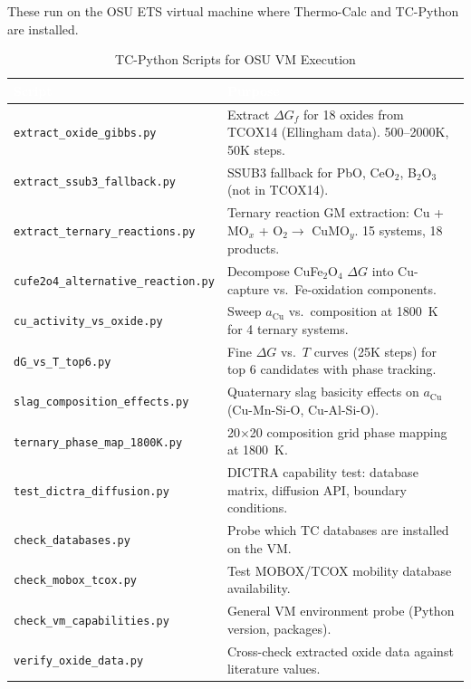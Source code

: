 \documentclass[11pt]{article}
\begin{document}
These run on the OSU ETS virtual machine where Thermo-Calc and TC-Python are installed.

\begin{table}[H]
\caption{TC-Python Scripts for OSU VM Execution}
\label{tab:vm_scripts}
\centering
\renewcommand{\arraystretch}{1.15}
\footnotesize
\begin{tabular}{|p{2.6in}|p{3.4in}|}
\hline
\rowcolor{headercolor}
\textcolor{white}{\textbf{Script}} & \textcolor{white}{\textbf{Purpose}} \\
\hline
\texttt{extract\_oxide\_gibbs.py} & Extract $\Delta G_f$ for 18 oxides from TCOX14 (Ellingham data). 500--2000K, 50K steps. \\
\hline
\rowcolor{altrow}
\texttt{extract\_ssub3\_fallback.py} & SSUB3 fallback for PbO, CeO$_2$, B$_2$O$_3$ (not in TCOX14). \\
\hline
\texttt{extract\_ternary\_reactions.py} & Ternary reaction GM extraction: Cu + MO$_x$ + O$_2 \to$ CuMO$_y$. 15 systems, 18 products. \\
\hline
\rowcolor{altrow}
\texttt{cufe2o4\_alternative\_reaction.py} & Decompose CuFe$_2$O$_4$ $\Delta G$ into Cu-capture vs.\ Fe-oxidation components. \\
\hline
\texttt{cu\_activity\_vs\_oxide.py} & Sweep $a_{\text{Cu}}$ vs.\ composition at \SI{1800}{\kelvin} for 4 ternary systems. \\
\hline
\rowcolor{altrow}
\texttt{dG\_vs\_T\_top6.py} & Fine $\Delta G$ vs.\ $T$ curves (25K steps) for top 6 candidates with phase tracking. \\
\hline
\texttt{slag\_composition\_effects.py} & Quaternary slag basicity effects on $a_{\text{Cu}}$ (Cu-Mn-Si-O, Cu-Al-Si-O). \\
\hline
\rowcolor{altrow}
\texttt{ternary\_phase\_map\_1800K.py} & 20$\times$20 composition grid phase mapping at \SI{1800}{\kelvin}. \\
\hline
\texttt{test\_dictra\_diffusion.py} & DICTRA capability test: database matrix, diffusion API, boundary conditions. \\
\hline
\rowcolor{altrow}
\texttt{check\_databases.py} & Probe which TC databases are installed on the VM. \\
\hline
\texttt{check\_mobox\_tcox.py} & Test MOBOX/TCOX mobility database availability. \\
\hline
\rowcolor{altrow}
\texttt{check\_vm\_capabilities.py} & General VM environment probe (Python version, packages). \\
\hline
\texttt{verify\_oxide\_data.py} & Cross-check extracted oxide data against literature values. \\

\end{tabular}
\end{table}
\end{document}
